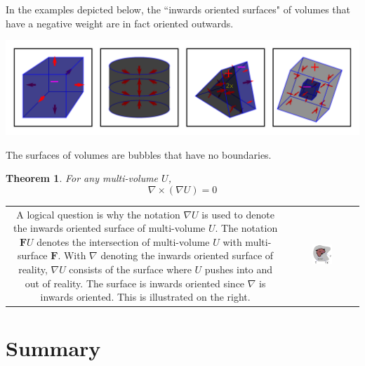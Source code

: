 \documentclass{book}
\newtheorem{thm}{Theorem}
\begin{document}
In the examples depicted below, the ``inwards oriented surfaces" of volumes that have a negative weight are in fact oriented outwards.

\begin{center}
\includegraphics[width = \textwidth]{Boundaries/Volume_inwards_oriented_surfaces/volume_surface_examples_2}
\end{center}

The surfaces of volumes are bubbles that have no boundaries. 
\begin{thm}
For any multi-volume \(U\), 
\[\nabla \times (\nabla U) = 0\]
\end{thm} 

\begin{tabular}{cc}
\parbox{0.5\textwidth}{
A logical question is why the notation \(\nabla U\) is used to denote the inwards oriented surface of multi-volume \(U\). The notation \(\mathbf{F} U\) denotes the intersection of multi-volume \(U\) with multi-surface \(\mathbf{F}\). With \(\nabla\) denoting the inwards oriented surface of reality, \(\nabla U\) consists of the surface where \(U\) pushes into and out of reality. The surface is inwards oriented since \(\nabla\) is inwards oriented. This is illustrated on the right.
} & \parbox{0.3\textwidth}{
\includegraphics[width = 0.3\textwidth]{Boundaries/Volume_inwards_oriented_surfaces/surface_volume_intersections_and_volume_surfaces}
}
\end{tabular}



\section{Summary}
\end{document}
